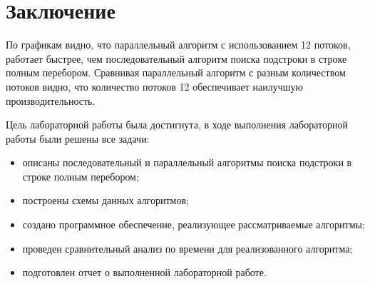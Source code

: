 \chapter*{Заключение}
По графикам видно, что параллельный алгоритм с использованием 12 потоков, работает быстрее, чем последовательный алгоритм поиска подстроки в строке полным перебором.
Сравнивая параллельный алгоритм с разным количеством потоков видно, что количество потоков 12 обеспечивает наилучшую производительность.

Цель лабораторной работы была достигнута, в ходе выполнения лабораторной работы были решены все задачи:
\begin{itemize}
	\item описаны последовательный и параллельный алгоритмы поиска подстроки в строке полным перебором;
	\item построены схемы данных алгоритмов;
	\item создано программное обеспечение, реализующее рассматриваемые алгоритмы;
	\item проведен сравнительный анализ по времени для реализованного алгоритма;
	\item подготовлен отчет о выполненной лабораторной работе.
\end{itemize}

